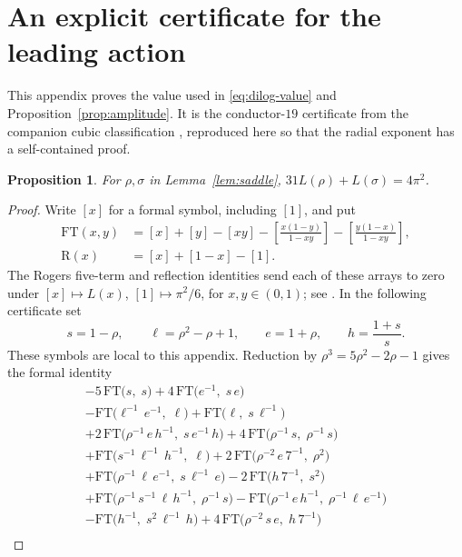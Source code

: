\documentclass[11pt,reqno]{amsart}
\newtheorem{proposition}[theorem]{Proposition}
\theoremstyle{remark}
\numberwithin{equation}{section}
\begin{document}
\appendix
\section{An explicit certificate for the leading action}\label{app:dilog}
This appendix proves the value used in \eqref{eq:dilog-value} and
Proposition~\ref{prop:amplitude}. It is the conductor-$19$ certificate
from the companion cubic classification \cite[Appendix~C, identity~8]{Cubic},
reproduced here so that the radial exponent has a self-contained proof.

\begin{proposition}\label{prop:dilog}
For $\rho,\sigma$ in Lemma~\ref{lem:saddle},
$31L(\rho)+L(\sigma)=4\pi^2$.
\end{proposition}
\begin{proof}
Write $[x]$ for a formal symbol, including $[1]$, and put
\begin{align*}
 \mathrm{FT}(x,y)&=[x]+[y]-[xy]
 -\left[\frac{x(1-y)}{1-xy}\right]
 -\left[\frac{y(1-x)}{1-xy}\right],\\
 \mathrm R(x)&=[x]+[1-x]-[1].
\end{align*}
The Rogers five-term and reflection identities send each of these
arrays to zero under $[x]\mapsto L(x)$, $[1]\mapsto\pi^2/6$,
for $x,y\in(0,1)$; see \cite{Zagier}. In the following certificate set
\[
 s=1-\rho,\qquad \ell=\rho^2-\rho+1,\qquad
 e=1+\rho,\qquad h=\frac{1+s}{s}.
\]
These symbols are local to this appendix. Reduction by
$\rho^3=5\rho^2-2\rho-1$ gives the formal identity
\begingroup\small
\begin{multline}\label{eq:dilog-certificate}
-5\,\mathrm{FT}\big(s,\;s\big) + 4\,\mathrm{FT}\big(e^{-1},\;s\,e\big)\\
- \mathrm{FT}\big(\ell^{-1}\,e^{-1},\;\ell\big) + \mathrm{FT}\big(\ell,\;s\,\ell^{-1}\big)\\
+ 2\,\mathrm{FT}\big(\rho^{-1}\,e\,h^{-1},\;s\,e^{-1}\,h\big) + 4\,\mathrm{FT}\big(\rho^{-1}\,s,\;\rho^{-1}\,s\big)\\
+ \mathrm{FT}\big(s^{-1}\,\ell^{-1}\,h^{-1},\;\ell\big) + 2\,\mathrm{FT}\big(\rho^{-2}\,e\,7^{-1},\;\rho^{2}\big)\\
+ \mathrm{FT}\big(\rho^{-1}\,\ell\,e^{-1},\;s\,\ell^{-1}\,e\big) - 2\,\mathrm{FT}\big(h\,7^{-1},\;s^{2}\big)\\
+ \mathrm{FT}\big(\rho^{-1}\,s^{-1}\,\ell\,h^{-1},\;\rho^{-1}\,s\big) - \mathrm{FT}\big(\rho^{-1}\,e\,h^{-1},\;\rho^{-1}\,\ell\,e^{-1}\big)\\
- \mathrm{FT}\big(h^{-1},\;s^{2}\,\ell^{-1}\,h\big) + 4\,\mathrm{FT}\big(\rho^{-2}\,s\,e,\;h\,7^{-1}\big)\\

\end{multline}
\end{proof}
\end{document}
